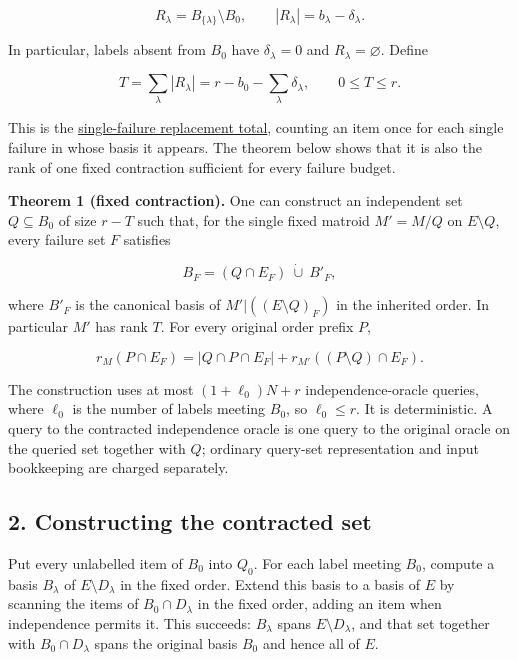 \[
R_\lambda=B_{\{\lambda\}}\setminus B_0,
\qquad |R_\lambda|=b_\lambda-\delta_\lambda.
\]

In particular, labels absent from \(B_0\) have \(\delta_\lambda=0\) and \(R_\lambda=\varnothing\). Define

\[
T=\sum_\lambda |R_\lambda|
 =r-b_0-\sum_\lambda\delta_\lambda,
\qquad 0\le T\le r.
\tag{1}
\]

This is the \href{https://github.com/icekylinx/algorithm-frontier/blob/main/problems/matroid-failure-summaries/manuscripts/two-failure-oracle-prefix-bounds.md}{single-failure replacement total}, counting an item once for each single failure in whose basis it appears. The theorem below shows that it is also the rank of one fixed contraction sufficient for every failure budget.

\textbf{Theorem 1 (fixed contraction).} One can construct an independent set \(Q\subseteq B_0\) of size \(r-T\) such that, for the single fixed matroid \(M'=M/Q\) on \(E\setminus Q\), every failure set \(F\) satisfies

\[
B_F=(Q\cap E_F)\ \dot\cup\ B'_F,
\tag{2}
\]

where \(B'_F\) is the canonical basis of \(M'|((E\setminus Q)_F)\) in the inherited order. In particular \(M'\) has rank \(T\). For every original order prefix \(P\),

\[
r_M(P\cap E_F)
 =|Q\cap P\cap E_F|
  +r_{M'}((P\setminus Q)\cap E_F).
\tag{3}
\]

The construction uses at most \((1+\ell_0)N+r\) independence-oracle queries, where \(\ell_0\) is the number of labels meeting \(B_0\), so \(\ell_0\le r\). It is deterministic. A query to the contracted independence oracle is one query to the original oracle on the queried set together with \(Q\); ordinary query-set representation and input bookkeeping are charged separately.

\hypertarget{af-b2bf8a6e14-constructing-the-contracted-set}{%
\subsection{2. Constructing the contracted set}\label{af-b2bf8a6e14-constructing-the-contracted-set}}

Put every unlabelled item of \(B_0\) into \(Q_0\). For each label meeting \(B_0\), compute a basis \(B_\lambda\) of \(E\setminus D_\lambda\) in the fixed order. Extend this basis to a basis of \(E\) by scanning the items of \(B_0\cap D_\lambda\) in the fixed order, adding an item when independence permits it. This succeeds: \(B_\lambda\) spans \(E\setminus D_\lambda\), and that set together with \(B_0\cap D_\lambda\) spans the original basis \(B_0\) and hence all of \(E\).

